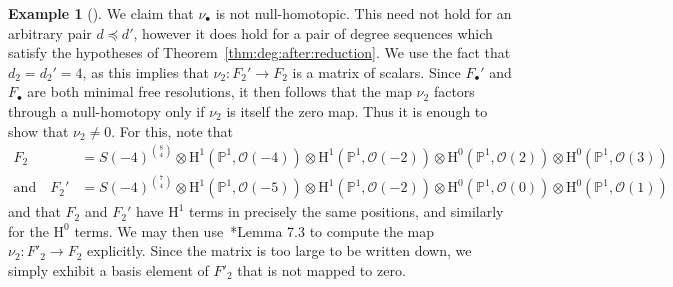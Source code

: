 \documentclass[12pt]{amsart}
\theoremstyle{definition}
\newtheorem{eg}[equation]{Example}
\newenvironment{example}[1][]{\begin{eg}[#1] \pushQED{\qed}}{\popQED \end{eg}}
\newcommand{\Hs}{\mathrm{H}}
\newcommand{\cO}{{\mathcal O}}
\newcommand{\PP}{\mathbb{P}}
\begin{document}
\begin{example}
We claim that $\nu_\bullet$ is not null-homotopic. This need not hold
for an arbitrary pair $d\preceq d'$, however it does hold for a pair
of degree sequences which satisfy the hypotheses of
Theorem~\ref{thm:deg:after:reduction}.  We use the fact that
$d_2=d_2'=4$, as this implies that $\nu_2\colon F_2' \to F_2$ is a
matrix of scalars.  Since $F_\bullet'$ and $F_\bullet$ are both
minimal free resolutions, it then follows that the map $\nu_2$ factors
through a null-homotopy only if $\nu_2$ is itself the zero map.  Thus
it is enough to show that $\nu_2\ne 0$.  For this, note that
\begin{align*}
F_2&=S(-4)^{\binom{8}{4}}\otimes \Hs^1(\PP^1, \cO(-4))\otimes \Hs^1(\PP^1, \cO(-2))\otimes \Hs^0(\PP^1, \cO(2))\otimes \Hs^0(\PP^1, \cO(3))\\
\text{and}\quad
F_2'&=S(-4)^{\binom{7}{4}}\otimes \Hs^1(\PP^1, \cO(-5))\otimes \Hs^1(\PP^1,
\cO(-2))\otimes \Hs^0(\PP^1, \cO(0))\otimes \Hs^0(\PP^1, \cO(1))
\end{align*}
and that $F_2$ and $F_2'$ have 
$\Hs^1$ terms in precisely the same positions, 
and similarly for the $\Hs^0$ terms. 
%
We may then use~\cite{explicit}*{Lemma 7.3} to compute the map
$\nu_2\colon F'_2\to F_2$ explicitly.  Since the matrix is too large
to be written down, we simply exhibit a basis element of $F'_2$ that
is not mapped to zero.


\end{example}
\end{document}
